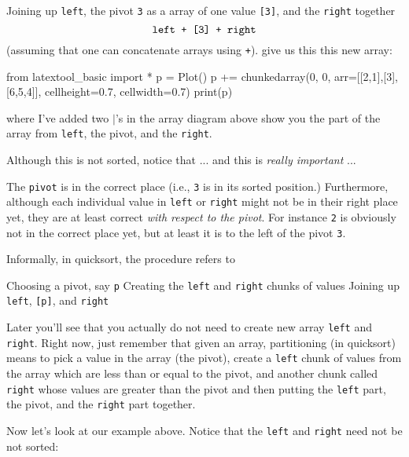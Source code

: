 Joining up \verb!left!, the pivot \verb!3! as a array of one value \verb![3]!, 
and the \verb!right! together
\[
\text{\texttt{left + [3] + right}}
\]
(assuming that one can concatenate arrays using \verb!+!).
give us this this new array:

\begin{python}
from latextool_basic import *
p = Plot()
p += chunkedarray(0, 0, arr=[[2,1],[3],[6,5,4]], cellheight=0.7, cellwidth=0.7)
print(p)
\end{python}

where I've added two $|$'s in the array diagram above show you the part of the 
array from \verb!left!, the pivot, and the \verb!right!.
 
Although this is not sorted, notice that ... 
and this is \textit{really important} ...
\begin{tightlist}
\li The \verb!pivot! is in the correct place (i.e., \verb!3! is in its sorted
    position.)
\li Furthermore, although each individual value in \verb!left!
or \verb!right! might not be in their right place yet, they
are at least correct \textit{with respect to the pivot}.
For instance \verb!2! is obviously not in the correct place yet,
but at least it is to the left of the pivot \verb!3!.
\end{tightlist}

Informally, in quicksort, the  procedure refers to
\begin{tightlist}
\li Choosing a pivot, say \verb!p!
\li Creating the \verb!left! and \verb!right! chunks of values
\li Joining up \verb!left!, \verb![p]!, and \verb!right!
\end{tightlist}
Later you'll see that you actually do not need to create new array
\verb!left! and \verb!right!.
Right now, just remember that given an array, 
partitioning (in quicksort) means to pick a value in the 
array (the pivot), create a \verb!left! chunk of values from the array
which are less than or equal to the pivot, and another 
chunk called \verb!right! whose values are greater than the pivot
and then putting the \verb!left! part, the pivot, and the \verb!right!
part together.

Now let's look at our example above.
Notice that the \verb!left! and \verb!right! need not be not sorted:

